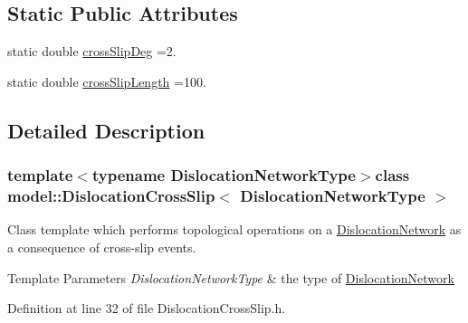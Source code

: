 \subsection*{Static Public Attributes}
\begin{DoxyCompactItemize}
\item 
static double \hyperlink{classmodel_1_1_dislocation_cross_slip_a279d98860e855377267c3e9ab3c963d3}{cross\+Slip\+Deg} =2.
\item 
static double \hyperlink{classmodel_1_1_dislocation_cross_slip_aff2bffb9ba2b71f6bcefebfd84057b3f}{cross\+Slip\+Length} =100.
\end{DoxyCompactItemize}


\subsection{Detailed Description}
\subsubsection*{template$<$typename Dislocation\+Network\+Type$>$class model\+::\+Dislocation\+Cross\+Slip$<$ Dislocation\+Network\+Type $>$}

Class template which performs topological operations on a \hyperlink{classmodel_1_1_dislocation_network}{Dislocation\+Network} as a consequence of cross-\/slip events. 


\begin{DoxyTemplParams}{Template Parameters}
{\em Dislocation\+Network\+Type} & the type of \hyperlink{classmodel_1_1_dislocation_network}{Dislocation\+Network} \\
\hline
\end{DoxyTemplParams}


Definition at line 32 of file Dislocation\+Cross\+Slip.\+h.




